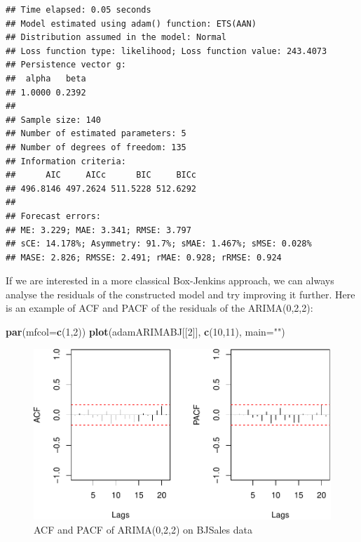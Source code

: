 \documentclass[]{book}
\newenvironment{Shaded}{\begin{snugshade}}{\end{snugshade}}
\newcommand{\DataTypeTok}[1]{\textcolor[rgb]{0.13,0.29,0.53}{#1}}
\newcommand{\DecValTok}[1]{\textcolor[rgb]{0.00,0.00,0.81}{#1}}
\newcommand{\KeywordTok}[1]{\textcolor[rgb]{0.13,0.29,0.53}{\textbf{#1}}}
\newcommand{\NormalTok}[1]{#1}
\newcommand{\StringTok}[1]{\textcolor[rgb]{0.31,0.60,0.02}{#1}}
\theoremstyle{definition}
\theoremstyle{definition}
\theoremstyle{definition}
\theoremstyle{definition}
\theoremstyle{remark}
\begin{document}
\begin{verbatim}
## Time elapsed: 0.05 seconds
## Model estimated using adam() function: ETS(AAN)
## Distribution assumed in the model: Normal
## Loss function type: likelihood; Loss function value: 243.4073
## Persistence vector g:
##  alpha   beta 
## 1.0000 0.2392 
## 
## Sample size: 140
## Number of estimated parameters: 5
## Number of degrees of freedom: 135
## Information criteria:
##      AIC     AICc      BIC     BICc 
## 496.8146 497.2624 511.5228 512.6292 
## 
## Forecast errors:
## ME: 3.229; MAE: 3.341; RMSE: 3.797
## sCE: 14.178%; Asymmetry: 91.7%; sMAE: 1.467%; sMSE: 0.028%
## MASE: 2.826; RMSSE: 2.491; rMAE: 0.928; rRMSE: 0.924
\end{verbatim}

If we are interested in a more classical Box-Jenkins approach, we can always analyse the residuals of the constructed model and try improving it further. Here is an example of ACF and PACF of the residuals of the ARIMA(0,2,2):

\begin{Shaded}
\begin{Highlighting}[]
\KeywordTok{par}\NormalTok{(}\DataTypeTok{mfcol=}\KeywordTok{c}\NormalTok{(}\DecValTok{1}\NormalTok{,}\DecValTok{2}\NormalTok{))}
\KeywordTok{plot}\NormalTok{(adamARIMABJ[[}\DecValTok{2}\NormalTok{]], }\KeywordTok{c}\NormalTok{(}\DecValTok{10}\NormalTok{,}\DecValTok{11}\NormalTok{), }\DataTypeTok{main=}\StringTok{""}\NormalTok{)}
\end{Highlighting}
\end{Shaded}

\begin{figure}
\centering
\includegraphics{Svetunkov--2022----ADAM_files/figure-latex/adamARIMAPlotBJSalesACFPACF-1.pdf}
\caption{\label{fig:adamARIMAPlotBJSalesACFPACF}ACF and PACF of ARIMA(0,2,2) on BJSales data}
\end{figure}
\end{document}

